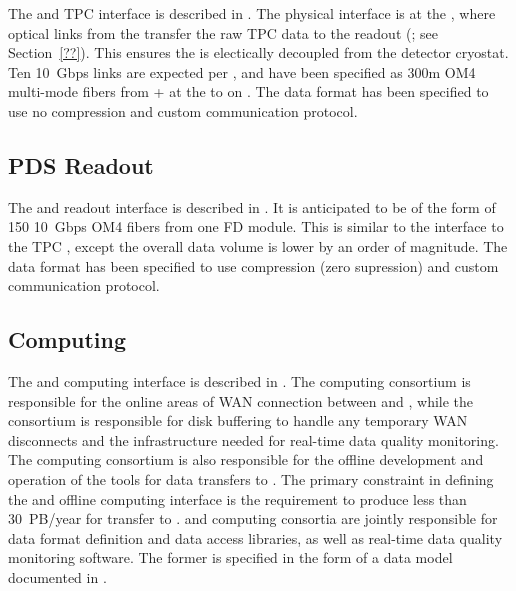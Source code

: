 The  and TPC  interface is described in
. The physical interface is at the , where optical links from the  transfer
the raw TPC data to the   readout (; see
Section~\ref{??}). This ensures the  is electically decoupled from the detector
cryostat. Ten \SI{10}{Gbps} links are expected per , and have
been specified as 300m OM4 multi-mode fibers from + at the  to
 on . The data format has been specified to use no
compression and custom communication protocol.

\subsection{PDS Readout}

The  and  readout interface is described in
. It is anticipated to
be of the form of 150  \SI{10}{Gbps} OM4 fibers from one FD module. 
This
is similar to the interface to the TPC , except the overall
data volume is lower by an order of magnitude. The data format has been specified to use
compression (zero supression) and custom communication protocol.

\subsection{Computing}

The  and computing interface is described in .
 The computing consortium %
 is responsible for the online areas of WAN connection between \surf and
\fnal, while the  consortium is responsible for disk buffering
to handle any temporary WAN disconnects and the infrastructure needed
for real-time data quality monitoring.  The computing consortium 
is also
responsible for the offline development and operation of the tools for data
transfers to \fnal. The primary
constraint in defining the  and offline computing interface is the
requirement to produce less than \SI{30}{PB/year} %
for transfer to
\fnal.  and %
computing consortia are jointly responsible for data
format definition and data access libraries, as well as real-time data
quality monitoring software. The former is specified in the form of a 
data model documented in .

